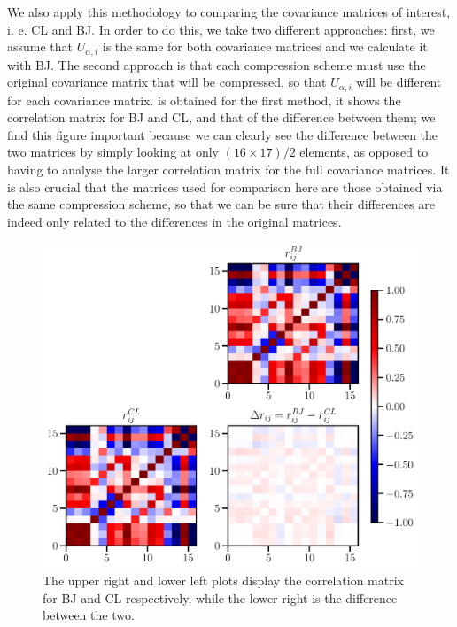 \documentclass[twocolumn]{\docclass}
\begin{document}
	We also apply this methodology to comparing the covariance matrices of interest, i. e. CL and BJ. In order to do this, we take two different approaches: first, we assume that $U_{\alpha, i}$ is the same for both covariance matrices and we calculate it with BJ. The second approach is that each compression scheme must use the original covariance matrix that will be compressed, so that $U_{\alpha, i}$ will be different for each covariance matrix.  is obtained for the first method, it shows the correlation matrix for BJ and CL, and that of the difference between them; we find this figure important because we can clearly see the difference between the two matrices by simply looking at only $(16 \times 17)/2$ elements, as opposed to having to analyse the larger correlation matrix for the full covariance matrices. It is also crucial that the matrices used for comparison here are those obtained via the same compression scheme, so that we can be sure that their differences are indeed only related to the differences in the original matrices.
	
	
	\begin{figure}
		\includegraphics[width=0.9\columnwidth]{Correlation_compression.pdf}
		\caption{The upper right and lower left plots display the correlation matrix for BJ and CL respectively, while the lower right is the difference between the two. \label{fig:correlation}}
	\end{figure}
	
	
	
\end{document}

